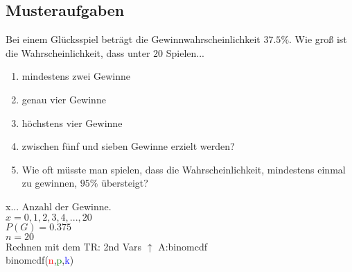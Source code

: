 \subsection{Musteraufgaben}

\hfill \break
Bei einem Glücksspiel beträgt die Gewinnwahrscheinlichkeit $37.5\%$. Wie groß ist die Wahrscheinlichkeit, dass unter $20$ Spielen...
\begin{enumerate}
    \item mindestens zwei Gewinne
    \item genau vier Gewinne
    \item höchstens vier Gewinne
    \item zwischen fünf und sieben Gewinne erzielt werden?
    \item Wie oft müsste man spielen, dass die Wahrscheinlichkeit, mindestens einmal zu gewinnen, $95\%$ übersteigt?
\end{enumerate}

\hfill \break
x... Anzahl der Gewinne.\\
$x=0,1,2,3,4,...,20$\\
$P(G) = 0.375$\\
$n=20$\\

Rechnen mit dem TR: 2nd Vars $\uparrow$ A:binomcdf\\
binomcdf(\textcolor{red}{n},\textcolor{green}{p},\textcolor{blue}{k})\\


